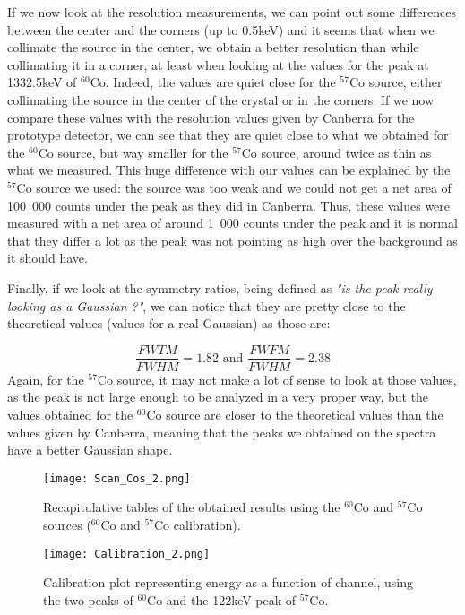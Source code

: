 \documentclass[11pt,a4paper]{article}
\begin{document}

If we now look at the resolution measurements, we can point out some differences between the center and the corners (up to 0.5keV) and it seems that when we collimate the source in the center, we obtain a better resolution than while collimating it in a corner, at least when looking at the values for the peak at 1332.5keV of $^{60}$Co. Indeed, the values are quiet close for the $^{57}$Co source, either collimating the source in the center of the crystal or in the corners. If we now compare these values with the resolution values given by Canberra for the prototype detector, we can see that they are quiet close to what we obtained for the $^{60}$Co source, but way smaller for the $^{57}$Co source, around twice as thin as what we measured. This huge difference with our values can be explained by the $^{57}$Co source we used: the source was too weak and we could not get a net area of 100~000 counts under the peak as they did in Canberra. Thus, these values were measured with a net area of around 1~000 counts under the peak and it is normal that they differ a lot as the peak was not pointing as high over the background as it should have.

Finally, if we look at the symmetry ratios, being defined as \textit{"is the peak really looking as a Gaussian ?"}, we can notice that they are pretty close to the theoretical values (values for a real Gaussian) as those are:

\begin{equation}
\dfrac{FWTM}{FWHM} = 1.82 \text{ and } \dfrac{FWFM}{FWHM} = 2.38
\end{equation}
Again, for the $^{57}$Co source, it may not make a lot of sense to look at those values, as the peak is not large enough to be analyzed in a very proper way, but the values obtained for the $^{60}$Co source are closer to the theoretical values than the values given by Canberra, meaning that the peaks we obtained on the spectra have a better Gaussian shape.

\begin{figure}[!h]
\centering
\texttt{[image: Scan\_Cos\_2.png]}
\caption{Recapitulative tables of the obtained results using the $^{60}$Co and $^{57}$Co sources ($^{60}$Co and $^{57}$Co calibration).}
\label{recap2}
\end{figure}

\begin{figure}[!ht]
\centering
\texttt{[image: Calibration\_2.png]}
\caption{Calibration plot representing energy as a function of channel, using the two peaks of $^{60}$Co and the 122keV peak of $^{57}$Co.}
\label{calib2}
\end{figure}
\end{document}
